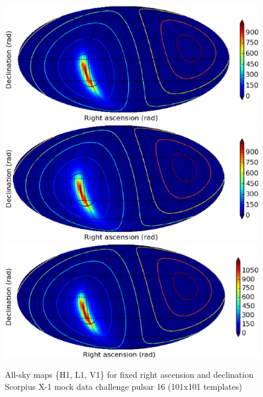 \begin{figure}
\begin{center}
\includegraphics[width=0.6\paperwidth,height=0.2\paperheight]{maptrueH1.eps}
\includegraphics[width=0.6\paperwidth,height=0.2\paperheight]{maptrueL1.eps}
\includegraphics[width=0.6\paperwidth,height=0.2\paperheight]{maptrueV1.eps}
\caption{ All-sky maps \{H1, L1, V1\} for fixed right ascension and declination
\newline Scorpius X-1 mock data challenge pulsar 16 (101x101 templates)
}
\end{center}
\end{figure}


